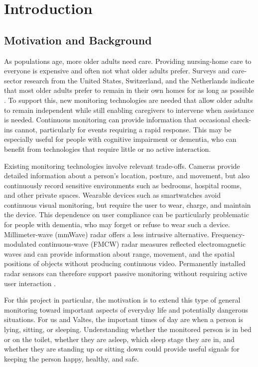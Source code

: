 
\section{Introduction}

\subsection{Motivation and Background}
As populations age, more older adults need care. Providing nursing-home care to everyone is expensive and often not what older adults prefer. Surveys and care-sector research from the United States, Switzerland, and the Netherlands indicate that most older adults prefer to remain in their own homes for as long as possible \cite{aarp2021aginginplace,unibas2020aginghome,rivm2026homecare}. To support this, new monitoring technologies are needed that allow older adults to remain independent while still enabling caregivers to intervene when assistance is needed. Continuous monitoring can provide information that occasional check-ins cannot, particularly for events requiring a rapid response. This may be especially useful for people with cognitive impairment or dementia, who can benefit from technologies that require little or no active interaction.

Existing monitoring technologies involve relevant trade-offs. Cameras provide detailed information about a person's location, posture, and movement, but also continuously record sensitive environments such as bedrooms, hospital rooms, and other private spaces. Wearable devices such as smartwatches avoid continuous visual monitoring, but require the user to wear, charge, and maintain the device. This dependence on user compliance can be particularly problematic for people with dementia, who may forget or refuse to wear such a device. Millimeter-wave (mmWave) radar offers a less intrusive alternative. Frequency-modulated continuous-wave (FMCW) radar measures reflected electromagnetic waves and can provide information about range, movement, and the spatial positions of objects without producing continuous video. Permanently installed radar sensors can therefore support passive monitoring without requiring active user interaction \cite{li2024sleepingpose,lai2023dual}.

For this project in particular, the motivation is to extend this type of general monitoring toward important aspects of everyday life and potentially dangerous situations. For us and Valtes, the important times of day are when a person is lying, sitting, or sleeping. Understanding whether the monitored person is in bed or on the toilet, whether they are asleep, which sleep stage they are in, and whether they are standing up or sitting down could provide useful signals for keeping the person happy, healthy, and safe.
